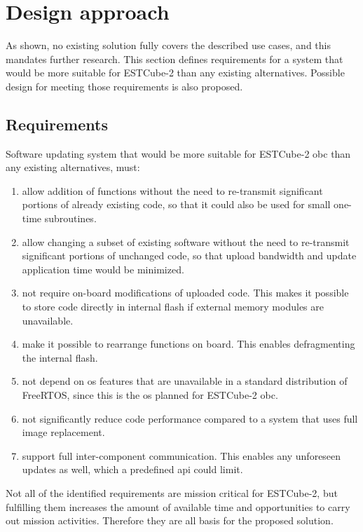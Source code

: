 \newpage
\section{Design approach}
\label{s:design}

As shown, no existing solution fully covers the described use cases, and this mandates further research. This section defines requirements for a system that would be more suitable for ESTCube-2 than any existing alternatives. Possible design for meeting those requirements is also proposed.

\subsection{Requirements}

Software updating system that would be more suitable for ESTCube-2 \gls{obc} than any existing alternatives, must:

\begin{enumerate}
	\item allow addition of functions without the need to re-transmit significant portions of already existing code, so that it could also be used for small one-time subroutines.
	\item allow changing a subset of existing software without the need to re-transmit significant portions of unchanged code, so that upload bandwidth and update application time would be minimized.
	\item not require on-board modifications of uploaded code. This makes it possible to store code directly in internal flash if external memory modules are unavailable.
	\item make it possible to rearrange functions on board. This enables defragmenting the internal flash.
	\item not depend on \gls{os} features that are unavailable in a standard distribution of Free\-RTOS, since this is the \gls{os} planned for ESTCube-2 \gls{obc}.
	\item not significantly reduce code performance compared to a system that uses full image replacement.
	\item support full inter-component communication. This enables any unforeseen updates as well, which a predefined \gls{api} could limit.
\end{enumerate}

Not all of the identified requirements are mission critical for ESTCube-2, but fulfilling them increases the amount of available time and opportunities to carry out mission activities. Therefore they are all basis for the proposed solution.

